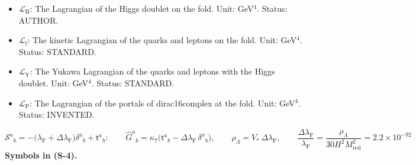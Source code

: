 \documentclass[
  10pt,
]{article}
\begin{document}
\begin{itemize}
  in the state of the medium (the vacuum, a plasma, the Kohn-Sham
  state). Status: STANDARD.
\item
  \(\mathcal{L}_{\mathrm{H}}\): The Lagrangian of the Higgs doublet on
  the fold. Unit: GeV\(^4\). Status: AUTHOR.
\item
  \(\mathcal{L}_{\mathrm{f}}\): The kinetic Lagrangian of the quarks and
  leptons on the fold. Unit: GeV\(^4\). Status: STANDARD.
\item
  \(\mathcal{L}_{\mathrm{Y}}\): The Yukawa Lagrangian of the quarks and
  leptons with the Higgs doublet. Unit: GeV\(^4\). Status: STANDARD.
\item
  \(\mathcal{L}_{\mathrm{P}}\): The Lagrangian of the portals of
  dirac16complex at the fold. Unit: GeV\(^4\). Status: INVENTED.
\end{itemize}

\[
\mathcal{S}^a{}_b = -\big(\lambda_{\mathrm{F}} + \Delta\lambda_{\mathrm{F}}\big)\delta^a{}_b + \mathsf{t}^a{}_b:\qquad
\hat G^a{}_b = \kappa_7\big(\mathsf{t}^a{}_b - \Delta\lambda_{\mathrm{F}}\,\delta^a{}_b\big),\qquad
\rho_\Lambda = V_*\,\Delta\lambda_{\mathrm{F}},\qquad
\frac{\Delta\lambda_{\mathrm{F}}}{\lambda_{\mathrm{F}}} = \frac{\rho_\Lambda}{30H^2M_{\mathrm{red}}^2} = 2.2\times10^{-92} \tag{S-4}
\] \textbf{Symbols in (S-4).}
\end{document}
